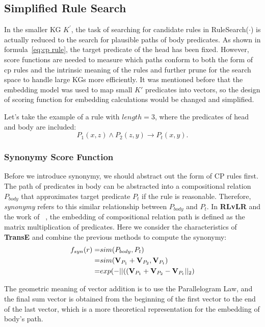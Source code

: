 \documentclass{article}
\begin{document}
	\subsection{Simplified Rule Search}
	In the smaller KG $K^{'}$, the task of searching for candidate rules in \textsf{RuleSearch($\cdot$)} is actually
reduced to the search for plausible paths of body predicates. As shown in formula~\ref{eq:cp rule}, the target predicate of the head has been fixed. However, score functions are needed to measure which paths conform to both the form of cp rules and the intrinsic meaning of the rules and further prune for the search space to handle large KGs more efficiently. It was mentioned before that the embedding model was used to map small $K'$ predicates into vectors, so the design of scoring function for embedding calculations would be changed and simplified. 
	
	Let's take the example of a rule with $length=3$, where the predicates of head and body are included:
	\begin{equation}
	P_1(x, z) \wedge P_2(z, y)  \to P_t(x, y). \nonumber
	\end{equation}
	
	\subsubsection{Synonymy Score Function}
	Before we introduce synonymy, we should abstract out the form of CP rules first. The path of predicates in body can be abstracted into a compositional relation $P_{body}$ that approximates target predicate $P_t$ if the rule is reasonable. Therefore, \textit{synonymy} refers to this similar relationship between $P_{body}$ and $P_t$. In {\bf RLvLR} and the work of ~\cite{Yang:2015}, the embedding of compositional relation path is defined as the matrix multiplication of predicates. Here we consider the characteristics of {\bf TransE} and combine the previous methods to compute the synonymy:
	\begin{align}
		f_{syn}(r) = & sim(P_{body},P_t)\\
		= &sim({\bf V}_{P_1} + {\bf V}_{P_2}, {\bf V}_{P_t}) \nonumber\\
		= & exp(-||(({\bf V}_{P_1}+ {\bf V}_{P_2} - {\bf V}_{P_t}||_2) \nonumber
	\end{align}
	
	The geometric meaning of vector addition is to use the Parallelogram Law, and the final sum vector is obtained from the beginning of the first vector to the end of the last vector, which is a more theoretical representation for the embedding of body's path.
	
\end{document}
